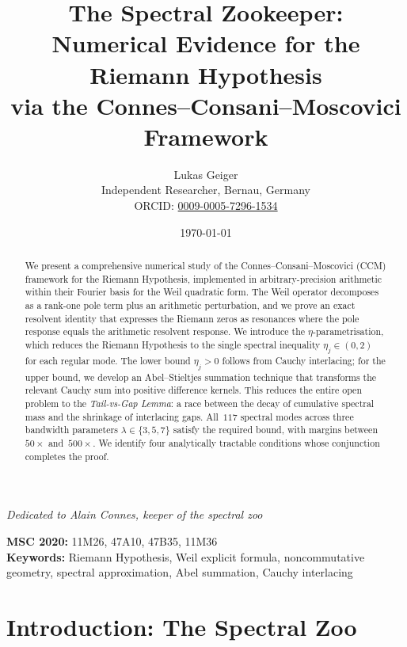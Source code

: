 \documentclass[12pt,a4paper]{article}
\title{The Spectral Zookeeper:\\[4pt]
{\large Numerical Evidence for the Riemann Hypothesis}\\[2pt]
{\large via the Connes--Consani--Moscovici Framework}}
\author{Lukas Geiger\\
\small Independent Researcher, Bernau, Germany\\
\small ORCID: \href{https://orcid.org/0009-0005-7296-1534}{0009-0005-7296-1534}}
\date{\today}
\theoremstyle{definition}
\theoremstyle{remark}
\begin{document}
\overfullrule=0pt
\maketitle

\begin{center}
\textit{Dedicated to Alain Connes, keeper of the spectral zoo}
\end{center}

\begin{abstract}
We present a comprehensive numerical study of the Connes--Consani--Moscovici (CCM)
framework for the Riemann Hypothesis, implemented in arbitrary-precision arithmetic
within their Fourier basis for the Weil quadratic form.
The Weil operator decomposes as a rank-one pole term plus an arithmetic perturbation,
and we prove an exact resolvent identity that expresses the Riemann zeros as resonances
where the pole response equals the arithmetic resolvent response.
We introduce the $\eta$-parametrisation, which reduces the Riemann Hypothesis
to the single spectral inequality $\eta_j \in (0,2)$ for each regular mode.
The lower bound $\eta_j > 0$ follows from Cauchy interlacing; for the upper bound,
we develop an Abel--Stieltjes summation technique that transforms the relevant
Cauchy sum into positive difference kernels.
This reduces the entire open problem to the \emph{Tail-vs-Gap Lemma}:
a race between the decay of cumulative spectral mass and the shrinkage of
interlacing gaps.
All~$117$ spectral modes across three bandwidth parameters
$\lambda \in \{3, 5, 7\}$ satisfy the required bound, with margins
between~$50\times$ and~$500\times$.
We identify four analytically tractable conditions whose conjunction
completes the proof.
\end{abstract}

\noindent\textbf{MSC 2020:} 11M26, 47A10, 47B35, 11M36\\
\textbf{Keywords:} Riemann Hypothesis, Weil explicit formula, noncommutative geometry,
spectral approximation, Abel summation, Cauchy interlacing

\newpage
\tableofcontents
\newpage

\section{Introduction: The Spectral Zoo}
\label{sec:intro}
\end{document}

